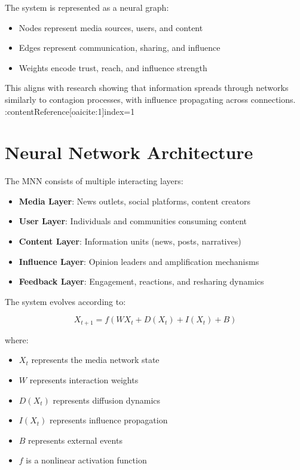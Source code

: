 \documentclass[12pt]{article}
\begin{document}
The system is represented as a neural graph:

\begin{itemize}
\item Nodes represent media sources, users, and content
\item Edges represent communication, sharing, and influence
\item Weights encode trust, reach, and influence strength
\end{itemize}

This aligns with research showing that information spreads through networks similarly to contagion processes, with influence propagating across connections. :contentReference[oaicite:1]{index=1}  

\section{Neural Network Architecture}

The MNN consists of multiple interacting layers:

\begin{itemize}
\item \textbf{Media Layer}: News outlets, social platforms, content creators
\item \textbf{User Layer}: Individuals and communities consuming content
\item \textbf{Content Layer}: Information units (news, posts, narratives)
\item \textbf{Influence Layer}: Opinion leaders and amplification mechanisms
\item \textbf{Feedback Layer}: Engagement, reactions, and resharing dynamics
\end{itemize}

The system evolves according to:

\[
X_{t+1} = f(WX_t + D(X_t) + I(X_t) + B)
\]

where:
\begin{itemize}
\item $X_t$ represents the media network state
\item $W$ represents interaction weights
\item $D(X_t)$ represents diffusion dynamics
\item $I(X_t)$ represents influence propagation
\item $B$ represents external events
\item $f$ is a nonlinear activation function
\end{itemize}
\end{document}
